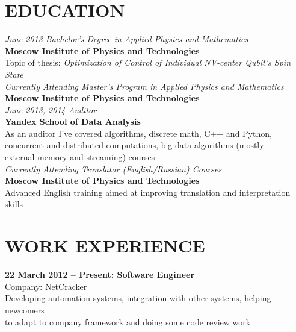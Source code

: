 \documentclass[margin,12pt]{res}
\begin{document}
  \address{28a Pervomayskaya Street, Dolgoprudny, Russian Federation\\
    kremsnx@gmail.com\\
    valery.ovchinnikov@phystech.edu\\
    +7 (985) 964-85-12}

\begin{resume}
\section{EDUCATION} 
\textit{June 2013 Bachelor's Degree in Applied Physics and Mathematics\\}
\textbf{Moscow Institute of Physics and Technologies}\\
Topic of thesis: \textit{Optimization of Control of Individual NV-center Qubit's Spin State}\\
\newline
\textit{Currently Attending Master's Program in Applied Physics and Mathematics\\}
\textbf{Moscow Institute of Physics and Technologies}\\
\newline
\textit{June 2013, 2014 Auditor\\}
\textbf{Yandex School of Data Analysis}\\
As an auditor I've covered algorithms, discrete math, C++ and Python,\\
 concurrent and distributed computations, big data algorithms (mostly\\
 external memory and streaming) courses\\
\newline
\textit{Currently Attending Translator (English/Russian) Courses\\}
\textbf{Moscow Institute of Physics and Technologies}\\
Advanced English training aimed at improving translation and
interpretation skills
\section{WORK EXPERIENCE} 
\textbf{22 March 2012 -- Present: Software Engineer}\\
Company: NetCracker\\
Developing automation systems, integration with other systems, helping newcomers\\
 to adapt to company framework and doing some code review work

\end{resume}
\end{document}
